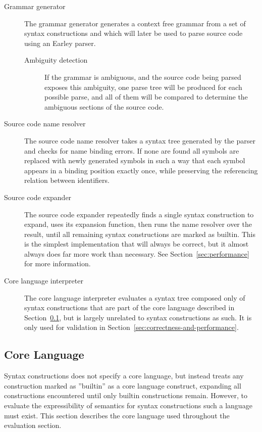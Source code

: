 \documentclass{kththesis}
\begin{document}
\begin{description}
  \item[Grammar generator] The grammar generator generates a context free grammar from a set of syntax constructions and which will later be used to parse source code using an Earley \cite{Earley1970An-Efficient-Co} parser.
  \begin{description}
    \item[Ambiguity detection] If the grammar is ambiguous, and the source code being parsed exposes this ambiguity, one parse tree will be produced for each possible parse, and all of them will be compared to determine the ambiguous sections of the source code.
  \end{description}

  \item[Source code name resolver] The source code name resolver takes a syntax tree generated by the parser and checks for name binding errors. If none are found all symbols are replaced with newly generated symbols in such a way that each symbol appears in a binding position exactly once, while preserving the referencing relation between identifiers.

  \item[Source code expander] The source code expander repeatedly finds a single syntax construction to expand, uses its expansion function, then runs the name resolver over the result, until all remaining syntax constructions are marked as builtin. This is the simplest implementation that will always be correct, but it almost always does far more work than necessary. See Section~\ref{sec:performance} for more information.

  \item[Core language interpreter] The core language interpreter evaluates a syntax tree composed only of syntax constructions that are part of the core language described in Section~\ref{sec:core-language}, but is largely unrelated to syntax constructions as such. It is only used for validation in Section~\ref{sec:correctness-and-performance}.
\end{description}

\subsection{Core Language} \label{sec:core-language}

Syntax constructions does not specify a core language, but instead treats any construction marked as ''builtin'' as a core language construct, expanding all constructions encountered until only builtin constructions remain. However, to evaluate the expressibility of semantics for syntax constructions such a language must exist. This section describes the core language used throughout the evaluation section.
\end{document}
